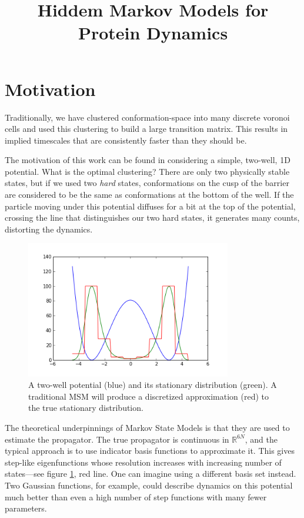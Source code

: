 \documentclass[10pt]{article}
\begin{document}
\title{Hiddem Markov Models for Protein Dynamics}
\maketitle

\section{Motivation}

Traditionally, we have clustered conformation-space into many discrete
voronoi cells and used this clustering to build a large transition matrix.
This results in implied timescales that are consistently faster than they
should be. 

The motivation of this work can be found in considering a simple, two-well,
1D potential. What is the optimal clustering? There are only two physically
stable states, but if we used two \textit{hard} states, conformations on the cusp
of the barrier are considered to be the same as conformations at the bottom of the well.
If the particle moving under this potential diffuses for a bit at the top of the potential,
crossing the line that distinguishes our two hard states, it generates many counts, distorting
the dynamics. 

\begin{figure}[htbp!]
	\centering
	\includegraphics[width=0.8\textwidth]{two-well.png}
	\caption{A two-well potential (blue) and its stationary distribution (green).
	A traditional MSM will produce a discretized approximation (red) to the true stationary
	distribution.}
	\label{two-well}
\end{figure}

The theoretical underpinnings of Markov State Models is that they are used to estimate
the propagator. The true propagator is continuous in $\mathbb{R}^{6N}$, and the typical
approach is to use indicator basis functions to approximate it. This gives step-like
eigenfunctions whose resolution increases with increasing number of states---see
figure \ref{two-well}, red line.  One can imagine
using a different basis set instead. Two Gaussian functions, for example, could describe
dynamics on this potential much better than even a high number of step functions with
many fewer parameters.
\end{document}
